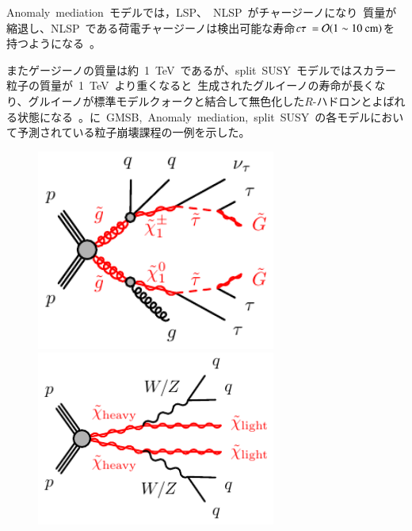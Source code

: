 Anomaly~mediation~モデルでは，LSP、~NLSP~がチャージーノになり~質量が縮退し、NLSP~である荷電チャージーノは検出可能な寿命$c\tau~=\mathcal{O}(\rm{1}\sim\rm{10}~\rm{cm})$を持つようになる~\cite{AR:12f}。

またゲージーノの質量は約~1~TeV~であるが、split~SUSY~モデルではスカラー粒子の質量が~1~TeV~より重くなると~生成されたグルイーノの寿命が長くなり、グルイーノが標準モデルクォークと結合して無色化した$R$-ハドロンとよばれる状態になる~\cite{AR:12c}。に~GMSB,~Anomaly~mediation,~split~SUSY~の各モデルにおいて予測されている粒子崩壊課程の一例を示した。

\begin{figure}[H]
	\begin{minipage}{0.49\hsize}
	\centering
    \includegraphics[width=0.7\textwidth]{img/diagram/gogo-qqgtautautauvGG-GMSB.pdf}
    \subcaption{}
    \end{minipage}
    \begin{minipage}{0.49\hsize}
    \centering
    \includegraphics[width=0.7\textwidth]{img/diagram/chichi-qqqq-XX.pdf}
    \subcaption{}
    \end{minipage}\\

\end{figure}
